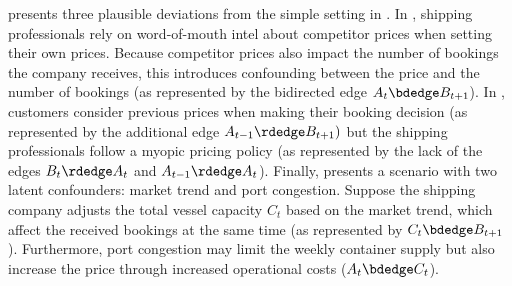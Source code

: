 \documentclass[12pt,a4paper]{article}
\theoremstyle{definition}
\begin{document}
 presents
three plausible deviations from the simple setting in
. %
In ,
shipping professionals rely on word-of-mouth intel about competitor
prices when setting their own prices. Because competitor prices also
impact the number of bookings the company receives, this introduces
confounding between the price and the number of bookings (as
represented by the bidirected edge $A_{t} \bdedge B_{t+1}$). In
, customers
consider previous prices when making their booking decision (as
represented by the additional edge $A_{t-1} \rdedge B_{t+1})$ but the
shipping professionals follow a myopic pricing policy (as represented
by the lack of the edges $B_{t} \rdedge A_{t}$ and $A_{t-1} \rdedge A_{t}$). Finally,
 presents a scenario with two latent
confounders: market trend and port congestion. Suppose the shipping
company adjusts the total vessel capacity %
$C_t$ based on the market trend, which %
affect the received bookings at the same time (as represented by $C_{t} \bdedge
B_{t+1}$). %
Furthermore, port congestion may limit the weekly container supply but
also increase the price through increased operational costs ($A_{t}
\bdedge C_{t}$).
\end{document}
